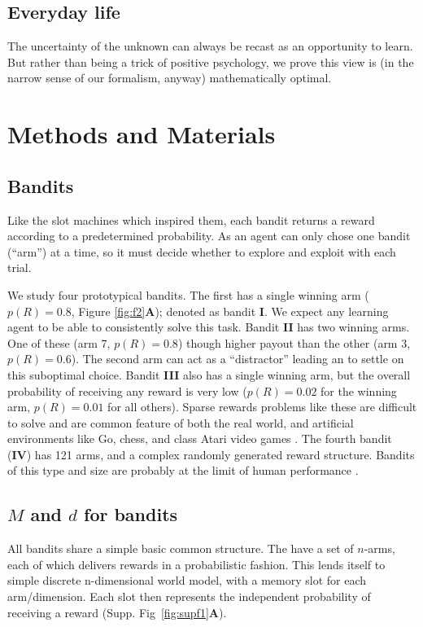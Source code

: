\documentclass[9pt,lineno]{elife}
\begin{document}
\subsection*{Everyday life} The uncertainty of the unknown can always be recast as an opportunity to learn. But rather than being a trick of positive psychology, we prove this view is (in the narrow sense of our formalism, anyway) mathematically optimal.

\section{Methods and Materials}
\subsection*{Bandits}
Like the slot machines which inspired them, each bandit returns a reward according to a predetermined probability. As an agent can only chose one bandit (``arm'') at a time, so it must decide whether to explore and exploit with each trial.

We study four prototypical bandits. The first has a single winning arm ($p(R) = 0.8$, Figure \ref{fig:f2}\textbf{A}); denoted as bandit \textbf{I}. We expect any learning agent to be able to consistently solve this task. Bandit \textbf{II} has two winning arms. One of these (arm 7, $p(R) = 0.8$) though higher payout than the other (arm 3, $p(R) = 0.6$). The second arm can act as a ``distractor'' leading an to settle on this suboptimal choice. Bandit \textbf{III} also has a single winning arm, but the overall probability of receiving any reward is very low ($p(R) = 0.02$ for the winning arm, $p(R) = 0.01$ for all others). Sparse rewards problems like these are difficult to solve and are common feature of both the real world, and artificial environments like Go, chess, and class Atari video games \citep{Mniha,Silver2016b,Silver2018}. The fourth bandit (\textbf{IV}) has 121 arms, and a complex randomly generated reward structure. Bandits of this type and size are probably at the limit of human performance \citep{Wu2018}. 

\subsection*{$M$ and $d$ for bandits}
All bandits share a simple basic common structure. The have a set of $n$-arms, each of which delivers rewards in a probabilistic fashion. This lends itself to simple discrete n-dimensional world model, with a memory  slot for each arm/dimension. Each slot then represents the independent probability of receiving a reward (Supp. Fig~\ref{fig:supf1}\textbf{A}). 
\end{document}
